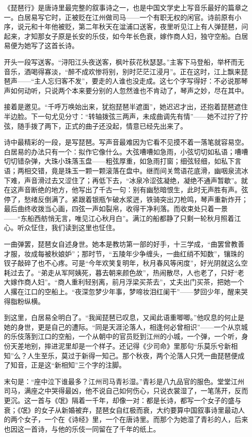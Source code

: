 \begin{appreciation}
《琵琶行》是唐诗里最完整的叙事诗之一，也是中国文学史上写音乐最好的篇章之一。白居易写它时，正被贬在江州做司马——一个有职无权的闲官。诗前原有小序，说元和十年他被贬，第二年秋天在湓浦口送客，夜里听见江上有人弹琵琶，问起来，才知那女子原是长安的乐伎，如今年长色衰，嫁作商人妇，独守空船。白居易便为她写了这首长诗。

开头一段写送客。“浔阳江头夜送客，枫叶荻花秋瑟瑟。”主客下马登船，举杯而无音乐，酒喝得寡淡，“醉不成欢惨将别，别时茫茫江浸月”。正在这时，江上飘来琵琶声——“主人忘归客不发”，要走的人谁也没走成。这七个字写得好：不必说那琴声如何动听，只说两个本来要分别的人忽然谁也不肯动了，琴声之妙，尽在其中。

接着是邀见。“千呼万唤始出来，犹抱琵琶半遮面”，她迟迟才出，还抱着琵琶遮住半边脸。下一句尤见分寸：“转轴拨弦三两声，未成曲调先有情”——她不过拧了拧弦，随手拨了两下，正式的曲子还没起，情意已经先出来了。

诗中最精彩的一段，是写琵琶。写声音最难因为它看不见摸不着一落笔就容易空。白居易的办法只有一个：拟作它像什么。大弦嘈嘈如急雨，小弦切切如私语；嘈嘈切切错杂弹，大珠小珠落玉盘——粗弦厚重，如急雨打窗；细弦轻细，如私下言语；两相交错，竟是珠玉一颗一颗滚落在盘中。继而间关莺语花底滑，幽咽泉流冰下难，声音滑过去又涩住了；再低下去，“冰泉冷涩弦凝绝，凝绝不通声暂歇”。就在这声音断绝的地方，他写出了千古一句：别有幽愁暗恨生，此时无声胜有声。弦停了，愁绪反倒满了。紧跟着银瓶乍破水浆迸，铁骑突出刀枪鸣，琴声重新炸开；最后曲终收拨当心画，四弦一声如裂帛，收得干净利落。而收束处只着一景——“东船西舫悄无言，唯见江心秋月白”。满江的船都静了只剩一轮秋月照着江心。听众怔住，我们读到这里也怔住。

一曲弹罢，琵琶女自述身世。她本是教坊第一部的好手，十三学成，“曲罢曾教善才服，妆成每被秋娘妒”；那时节，“五陵年少争缠头，一曲红绡不知数”，镶珠的钗子敲碎了也不心疼。可是“今年欢笑复明年，秋月春风等闲度”，好光阴就这么空耗过去了。“弟走从军阿姨死，暮去朝来颜色故”，热闹散尽，人也老了，只好“老大嫁作商人妇”。“商人重利轻别离，前月浮梁买茶去”，丈夫出门买茶，把她一个人撂在江口的空船上。“夜深忽梦少年事，梦啼妆泪红阑干”——梦回少年，醒来哭得脂粉纵横。

到这里，白居易全明白了。“我闻琵琶已叹息，又闻此语重唧唧。”他叹息的何止是她的身世，更是自己的遭际。“同是天涯沦落人，相逢何必曾相识”——一个从京城的乐伎落到江口的空船，一个从朝中的官员贬到江州的小城，一个弹，一个听，身份天差地别，摔进泥里却是一个样子。还记得《少司命》里那句“乐莫乐兮新相知”么？人生至乐，莫过于新得一知己。那个秋夜，两个沦落人只凭一曲琵琶便成了知音，正是这“新相知”三个字的注脚。

末句是：“座中泣下谁最多？江州司马青衫湿。”青衫是八九品官的服色。堂堂江州司马，满座之中哭得最凶，他不说自己如何伤心，只说衣裳湿了，一笔荡开，反而更沉。这一首与《氓》隔着一千年，却像一对：都是长诗，都写一个女子的盛与衰；《氓》的女子从新婚被弃，琵琶女自红极而衰，大约要算中国叙事诗里最动人的两个女子，一个在《诗经》里，一个在唐诗里。而那个为她湿了青衫的人，后来也因这一首诗，与他的乐伎一同留在了千年的纸上。
\end{appreciation}
